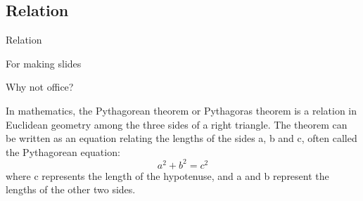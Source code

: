 \documentclass[10pt]{beamer}
\begin{document}
\subsection{Relation}
\begin{frame}{Relation}
	\begin{itemize}
	\item For making slides
		\pause
		\visible<6-6>
		{
		\item Why not office?
		}
	\end{itemize}
In mathematics, the Pythagorean theorem or Pythagoras theorem is a relation in Euclidean geometry among the three sides of a right triangle. The theorem can be written as an equation relating the lengths of the sides a, b and c, often called the Pythagorean equation:
\begin{equation}
\label{one}
a^2+b^2=c^2
\end{equation}
where c represents the length of the hypotenuse, and a and b represent the lengths of the other two sides.

\end{frame}
\end{document}
